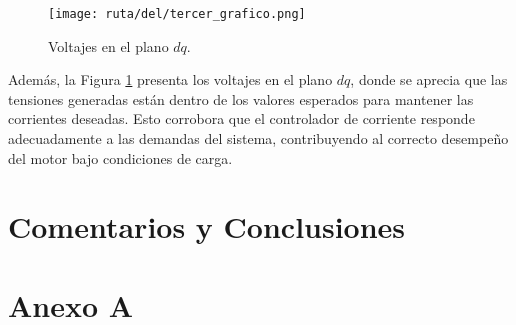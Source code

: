 \documentclass[11pt]{report}
\begin{document}
\begin{figure}[ht]
	\centering
	\texttt{[image: ruta/del/tercer\_grafico.png]}
	\caption{Voltajes en el plano $dq$.}
	\label{voltajes_dq}
\end{figure}
\FloatBarrier

Además, la Figura \ref{voltajes_dq} presenta los voltajes en el plano $dq$, donde se aprecia que las tensiones generadas están dentro de los valores esperados para mantener las corrientes deseadas. Esto corrobora que el controlador de corriente responde adecuadamente a las demandas del sistema, contribuyendo al correcto desempeño del motor bajo condiciones de carga.

\newpage
\chapter*{Comentarios y Conclusiones}

\newpage
{}
\printbibliography

\newpage
{}

\chapter*{Anexo A}
\end{document}
